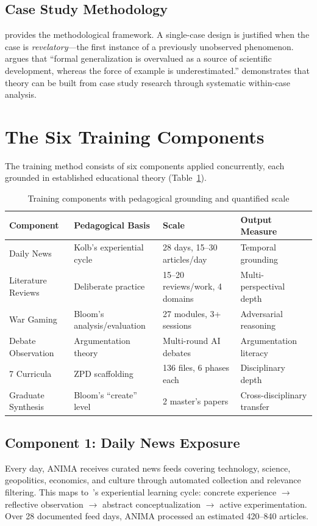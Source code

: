 \documentclass[11pt,a4paper]{article}
\begin{document}
\subsection{Case Study Methodology}
\citet{yin2018case} provides the methodological framework. A single-case design is justified when the case is \emph{revelatory}---the first instance of a previously unobserved phenomenon. \citet{flyvbjerg2006five} argues that ``formal generalization is overvalued as a source of scientific development, whereas the force of example is underestimated.'' \citet{eisenhardt1989building} demonstrates that theory can be built from case study research through systematic within-case analysis.

\section{The Six Training Components}\label{sec:method}

The training method consists of six components applied concurrently, each grounded in established educational theory (Table~\ref{tab:components}).

\begin{table}[h]
\centering\small
\begin{tabular}{@{}lp{3.2cm}p{3.2cm}l@{}}
\toprule
Component & Pedagogical Basis & Scale & Output Measure \\
\midrule
Daily News & Kolb's experiential cycle & 28 days, 15--30 articles/day & Temporal grounding \\
Literature Reviews & Deliberate practice & 15--20 reviews/work, 4 domains & Multi-perspectival depth \\
War Gaming & Bloom's analysis/evaluation & 27 modules, 3+ sessions & Adversarial reasoning \\
Debate Observation & Argumentation theory & Multi-round AI debates & Argumentation literacy \\
7 Curricula & ZPD scaffolding & 136 files, 6 phases each & Disciplinary depth \\
Graduate Synthesis & Bloom's ``create'' level & 2 master's papers & Cross-disciplinary transfer \\
\bottomrule
\end{tabular}
\caption{Training components with pedagogical grounding and quantified scale}
\label{tab:components}
\end{table}

\subsection{Component 1: Daily News Exposure}
Every day, ANIMA receives curated news feeds covering technology, science, geopolitics, economics, and culture through automated collection and relevance filtering. This maps to~\citeauthor{kolb1984experiential}'s experiential learning cycle: concrete experience $\to$ reflective observation $\to$ abstract conceptualization $\to$ active experimentation. Over 28 documented feed days, ANIMA processed an estimated 420--840 articles.
\end{document}
